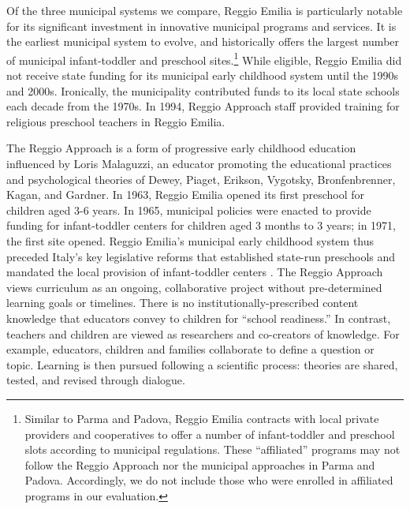 Of the three municipal systems we compare, Reggio Emilia is particularly notable for its significant investment in innovative municipal programs and services. It is the earliest municipal system to evolve, and historically offers the largest number of municipal infant-toddler and preschool sites.\footnote{Similar to Parma and Padova, Reggio Emilia contracts with local private providers and cooperatives to offer a number of infant-toddler and preschool slots according to municipal regulations. These ``affiliated'' programs may not follow the Reggio Approach nor the municipal approaches in Parma and Padova. Accordingly, we do not include those who were enrolled in affiliated programs in our evaluation.} While eligible, Reggio Emilia did not receive state funding for its municipal early childhood system until the 1990s and 2000s. Ironically, the municipality contributed funds to its local state schools each decade from the 1970s. In 1994, Reggio Approach staff provided training for religious preschool teachers in Reggio Emilia. 

The Reggio Approach is a form of progressive early childhood education influenced by Loris Malaguzzi, an educator promoting the educational practices and psychological theories of Dewey, Piaget, Erikson, Vygotsky, Bronfenbrenner, Kagan, and Gardner. In 1963, Reggio Emilia opened its first preschool for children aged 3-6 years. In 1965, municipal policies were enacted to provide funding for infant-toddler centers for children aged 3 months to 3 years; in 1971, the first site opened. Reggio Emilia's municipal early childhood system thus preceded Italy's key legislative reforms that established state-run preschools and mandated the local provision of infant-toddler centers \citep{Cagliari-etal-eds_2016_BOOK_Loris-Malaguzzi}. The Reggio Approach views curriculum as an ongoing, collaborative project without pre-determined learning goals or timelines. There is no institutionally-prescribed content knowledge that educators convey to children for ``school readiness.'' In contrast, teachers and children are viewed as researchers and co-creators of knowledge. For example, educators, children and families collaborate to define a question or topic. Learning is then pursued following a scientific process: theories are shared, tested, and revised through dialogue. 

